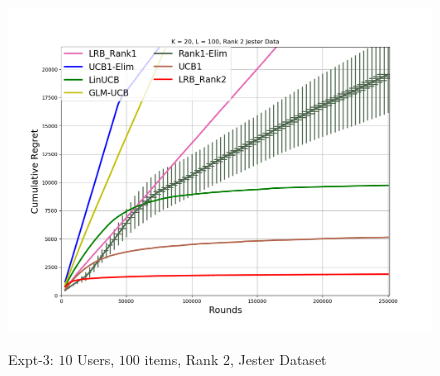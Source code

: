 \begin{figure}
    {
    		\includegraphics[scale=0.13]{img/Figure_L4.png}
   }
 \caption{Expt-$3$: $10$ Users, $100$ items, Rank $2$, Jester Dataset}
 \label{fig:6}
 \vspace{-2em}
\end{figure}

